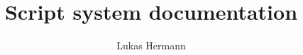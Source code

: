 \documentclass[12pt, a4paper]{article}
\begin{document}
\title{Script system documentation}
\author{Lukas Hermann}
\maketitle

\tableofcontents

\newpage


\end{document}
